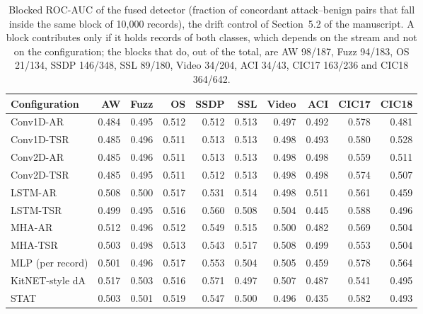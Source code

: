 \begin{table}[ht]\centering\footnotesize\setlength{\tabcolsep}{3.5pt}
\begin{tabular}{lrrrrrrrrr}
\hline
\textbf{Configuration} & \textbf{AW} & \textbf{Fuzz} & \textbf{OS} & \textbf{SSDP} & \textbf{SSL} & \textbf{Video} & \textbf{ACI} & \textbf{CIC17} & \textbf{CIC18}\\
\hline
Conv1D-AR & 0.484 & 0.495 & 0.512 & 0.512 & 0.513 & 0.497 & 0.492 & 0.578 & 0.481\\
Conv1D-TSR & 0.485 & 0.496 & 0.511 & 0.513 & 0.513 & 0.498 & 0.493 & 0.580 & 0.528\\
Conv2D-AR & 0.485 & 0.496 & 0.511 & 0.513 & 0.513 & 0.498 & 0.498 & 0.559 & 0.511\\
Conv2D-TSR & 0.485 & 0.495 & 0.511 & 0.512 & 0.513 & 0.498 & 0.498 & 0.574 & 0.507\\
LSTM-AR & 0.508 & 0.500 & 0.517 & 0.531 & 0.514 & 0.498 & 0.511 & 0.561 & 0.459\\
LSTM-TSR & 0.499 & 0.495 & 0.516 & 0.560 & 0.508 & 0.504 & 0.445 & 0.588 & 0.496\\
MHA-AR & 0.512 & 0.496 & 0.512 & 0.549 & 0.515 & 0.500 & 0.482 & 0.569 & 0.504\\
MHA-TSR & 0.503 & 0.498 & 0.513 & 0.543 & 0.517 & 0.508 & 0.499 & 0.553 & 0.504\\
MLP (per record) & 0.501 & 0.496 & 0.517 & 0.553 & 0.504 & 0.505 & 0.459 & 0.578 & 0.564\\
KitNET-style dA & 0.517 & 0.503 & 0.516 & 0.571 & 0.497 & 0.507 & 0.487 & 0.541 & 0.495\\
STAT & 0.503 & 0.501 & 0.519 & 0.547 & 0.500 & 0.496 & 0.435 & 0.582 & 0.493\\
\hline
\end{tabular}
\caption{Blocked ROC-AUC of the fused detector (fraction of concordant attack--benign pairs that fall inside the same block of 10{,}000 records), the drift control of Section~5.2 of the manuscript. A block contributes only if it holds records of both classes, which depends on the stream and not on the configuration; the blocks that do, out of the total, are AW 98/187, Fuzz 94/183, OS 21/134, SSDP 146/348, SSL 89/180, Video 34/204, ACI 34/43, CIC17 163/236 and CIC18 364/642.}\label{tab:s_loc}
\end{table}

